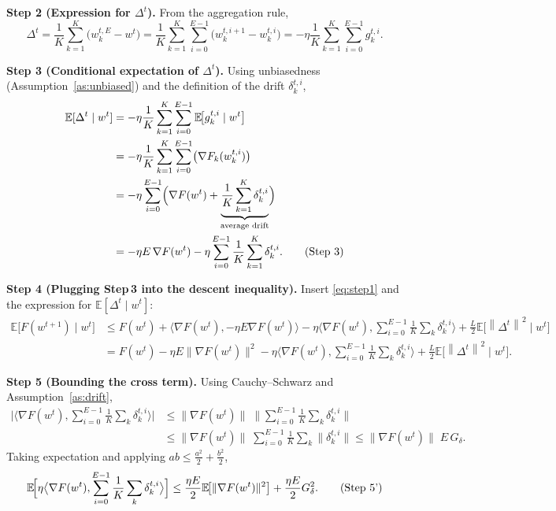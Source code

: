 \documentclass{article}
\newcommand{\EE}{\mathbb{E}}
\newcommand{\norm}[1]{\left\|#1\right\|}
\begin{document}
\noindent\textbf{Step 2 (Expression for $\Delta^{t}$).}
From the aggregation rule,
\[
\Delta^{t}= \frac1K\sum_{k=1}^{K}\bigl(w_{k}^{t,E}-w^{t}\bigr)
= \frac1K\sum_{k=1}^{K}\sum_{i=0}^{E-1}\bigl(w_{k}^{t,i+1}-w_{k}^{t,i}\bigr)
= -\eta\frac1K\sum_{k=1}^{K}\sum_{i=0}^{E-1} g_{k}^{t,i}.
\tag{Step 2}
\]

\noindent\textbf{Step 3 (Conditional expectation of $\Delta^{t}$).}
Using unbiasedness (Assumption~\ref{as:unbiased}) and the definition of the
drift $\delta_{k}^{t,i}$,
\begin{align}
\EE[\Delta^{t}\mid w^{t}]
&= -\eta\frac1K\sum_{k=1}^{K}\sum_{i=0}^{E-1}
\EE\!\bigl[g_{k}^{t,i}\mid w^{t}\bigr] \nonumber\\
&= -\eta\frac1K\sum_{k=1}^{K}\sum_{i=0}^{E-1}
\bigl(\nabla F_k(w_{k}^{t,i})\bigr) \nonumber\\
&= -\eta\sum_{i=0}^{E-1}\Bigl(\nabla F(w^{t})+\underbrace{\frac1K\sum_{k=1}^{K}
\delta_{k}^{t,i}}_{\text{average drift}}\Bigr) \nonumber\\
&= -\eta E\,\nabla F(w^{t})
-\eta\sum_{i=0}^{E-1}\frac1K\sum_{k=1}^{K}\delta_{k}^{t,i}.
\tag{Step 3}
\end{align}

\noindent\textbf{Step 4 (Plugging Step 3 into the descent inequality).}
Insert \eqref{eq:step1} and the expression for $\EE[\Delta^{t}\mid w^{t}]$:
\begin{align}
\EE\!\bigl[F(w^{t+1})\mid w^{t}\bigr]
&\le F(w^{t})+\big\langle\nabla F(w^{t}),-\eta E\nabla F(w^{t})\big\rangle
   -\eta\Big\langle\nabla F(w^{t}),\sum_{i=0}^{E-1}\frac1K\sum_{k}\delta_{k}^{t,i}\Big\rangle
   +\frac{L}{2}\EE\!\bigl[\norm{\Delta^{t}}^{2}\mid w^{t}\bigr] \nonumber\\
&= F(w^{t})-\eta E\|\nabla F(w^{t})\|^{2}
   -\eta\Big\langle\nabla F(w^{t}),\sum_{i=0}^{E-1}\frac1K\sum_{k}\delta_{k}^{t,i}\Big\rangle
   +\frac{L}{2}\EE\!\bigl[\norm{\Delta^{t}}^{2}\mid w^{t}\bigr]. \tag{Step 4}
\end{align}

\noindent\textbf{Step 5 (Bounding the cross term).}
Using Cauchy–Schwarz and Assumption~\ref{as:drift},
\begin{align}
\Big|\big\langle\nabla F(w^{t}),\sum_{i=0}^{E-1}\frac1K\sum_{k}\delta_{k}^{t,i}\big\rangle\Big|
&\le \|\nabla F(w^{t})\|\;
      \Big\|\sum_{i=0}^{E-1}\frac1K\sum_{k}\delta_{k}^{t,i}\Big\| \nonumber\\
&\le \|\nabla F(w^{t})\|\;
      \sum_{i=0}^{E-1}\frac1K\sum_{k}\|\delta_{k}^{t,i}\|
 \le \|\nabla F(w^{t})\|\;E\,G_{\delta}. \tag{Step 5}
\end{align}
Taking expectation and applying $ab\le\frac{a^{2}}{2}+\frac{b^{2}}{2}$,
\[
\EE\!\Bigl[\eta\big\langle\nabla F(w^{t}),\sum_{i=0}^{E-1}\frac1K\sum_{k}\delta_{k}^{t,i}\big\rangle\Bigr]
\le \frac{\eta E}{2}\EE\!\bigl[\|\nabla F(w^{t})\|^{2}\bigr]
   +\frac{\eta E}{2}G_{\delta}^{2}. \tag{Step 5'}
\]
\end{document}
